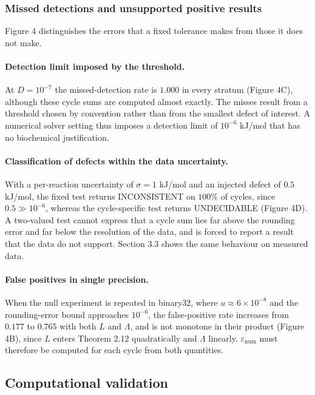 \documentclass[11pt,a4paper]{article}
\theoremstyle{pstyle}
\theoremstyle{definition}
\theoremstyle{remark}
\newcommand{\eps}{\varepsilon}
\newcommand{\epsnum}{\eps_{\mathrm{num}}}
\newcommand{\mach}{u}
\begin{document}
\subsubsection{Missed detections and unsupported positive results}

Figure 4 distinguishes the errors that a fixed tolerance
makes from those it does not make.

\paragraph{Detection limit imposed by the threshold.} At $D=10^{-7}$ the
missed-detection rate is $1.000$ in every stratum
(Figure 4C), although these cycle sums are computed almost
exactly. The misses result from a threshold chosen by convention rather
than from the smallest defect of interest. A numerical solver setting
thus imposes a detection limit of $10^{-6}$ kJ/mol that has no
biochemical justification.

\paragraph{Classification of defects within the data uncertainty.} With
a per-reaction uncertainty of $\sigma=1$ kJ/mol and an injected defect of
$0.5$ kJ/mol, the fixed test returns \textsf{INCONSISTENT} on $100\%$ of
cycles, since $0.5 \gg 10^{-6}$, whereas the cycle-specific test returns
\textsf{UNDECIDABLE} (Figure 4D). A two-valued test cannot
express that a cycle sum lies far above the rounding error and far
below the resolution of the data, and is forced to report a result that
the data do not support. Section 3.3 shows the same behaviour on
measured data.

\paragraph{False positives in single precision.} When the null
experiment is repeated in binary32, where $\mach\approx6\times10^{-8}$
and the rounding-error bound approaches $10^{-6}$, the false-positive
rate increases from $0.177$ to $0.765$ with both $L$ and $\Lambda$, and
is not monotone in their product (Figure 4B), since $L$
enters Theorem 2.12 quadratically and $\Lambda$ linearly.
$\epsnum$ must therefore be computed for each cycle from both
quantities.

\subsection{Computational validation}
\label{sec:validation}
\end{document}
